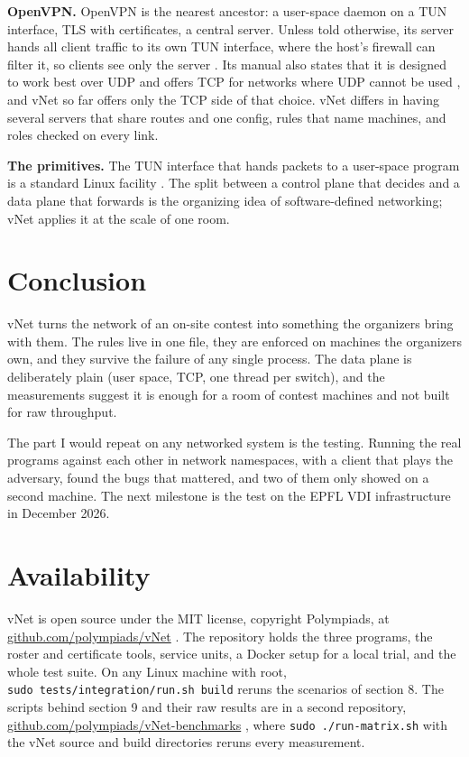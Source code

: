 \documentclass[11pt,a4paper]{article}
\begin{document}
\textbf{OpenVPN.} OpenVPN is the nearest ancestor: a user-space daemon on a TUN interface, TLS with certificates, a central server. Unless told otherwise, its server hands all client traffic to its own TUN interface, where the host's firewall can filter it, so clients see only the server \cite{ref5}. Its manual also states that it is designed to work best over UDP and offers TCP for networks where UDP cannot be used \cite{ref5}, and vNet so far offers only the TCP side of that choice. vNet differs in having several servers that share routes and one config, rules that name machines, and roles checked on every link.

\textbf{The primitives.} The TUN interface that hands packets to a user-space program is a standard Linux facility \cite{ref7}. The split between a control plane that decides and a data plane that forwards is the organizing idea of software-defined networking; vNet applies it at the scale of one room.

\hypertarget{conclusion}{%
\section{Conclusion}\label{conclusion}}

vNet turns the network of an on-site contest into something the organizers bring with them. The rules live in one file, they are enforced on machines the organizers own, and they survive the failure of any single process. The data plane is deliberately plain (user space, TCP, one thread per switch), and the measurements suggest it is enough for a room of contest machines and not built for raw throughput.

The part I would repeat on any networked system is the testing. Running the real programs against each other in network namespaces, with a client that plays the adversary, found the bugs that mattered, and two of them only showed on a second machine. The next milestone is the test on the EPFL VDI infrastructure in December 2026.

\hypertarget{availability}{%
\section*{Availability}\label{availability}}

vNet is open source under the MIT license, copyright Polympiads, at \href{https://github.com/polympiads/vNet}{github.com/polympiads/vNet} \cite{ref8}. The repository holds the three programs, the roster and certificate tools, service units, a Docker setup for a local trial, and the whole test suite. On any Linux machine with root, \texttt{sudo\ tests/integration/run.sh\ build} reruns the scenarios of section 8. The scripts behind section 9 and their raw results are in a second repository, \href{https://github.com/polympiads/vNet-benchmarks}{github.com/polympiads/vNet-benchmarks} \cite{ref10}, where \texttt{sudo\ ./run-matrix.sh} with the vNet source and build directories reruns every measurement.
\end{document}
